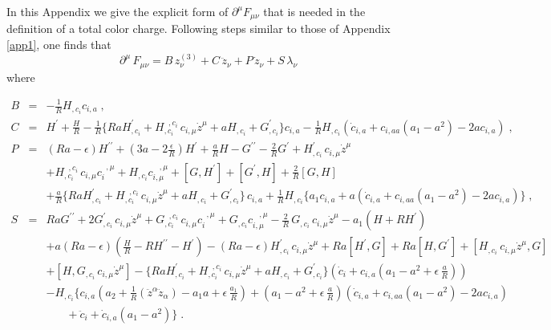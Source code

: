 \documentclass[a4paper,twocolumn,prd,showpacs,amsmath,amssymb]{revtex4}
\begin{document}
In this Appendix we give the explicit form of $\partial^{\mu} F_{\mu\nu}$
that is needed in the definition of a total color charge.
Following steps similar to those of Appendix \ref{app1}, one finds that
\[ \partial^{\mu} \, F_{\mu\nu} = B \, z^{(3)}_{\nu} + C \, \ddot{z}_{\nu}
+ P \, \dot{z}_{\nu} + S \, \lambda_{\nu} \] where
\begin{widetext}
\begin{eqnarray}
B & = & - \frac{1}{R} H_{,c_{i}} c_{i,a} \; , \\
C & = & H^{\prime} + \frac{H}{R} - \frac{1}{R} \lbrace R a H^{\prime}_{,c_{i}} +
H_{,c_{i}}^{\;\; ,c_{i}} \, c_{i,\mu} \dot{z}^{\mu} + a H_{,c_{i}}
+ G^{\prime}_{,c_{i}} \rbrace c_{i,a} - \frac{1}{R} H_{,c_{i}}
(\dot{c}_{i,a} + c_{i,aa} (a_1 - a^2) -2 a c_{i,a}) \; , \\
P & = & (R a - \epsilon) H^{\prime\prime} + (3 a -2 \frac{\epsilon}{R}) H^{\prime}
+ \frac{a}{R} H - G^{\prime\prime} - \frac{2}{R} G^{\prime} + H^{\prime}_{,c_{i}} \, c_{i,\mu} \dot{z}^{\mu} \nonumber \\
& & + H_{,c_{i}}^{\;\; ,c_{i}} \, c_{i,\mu} c_{i}^{\;\; ,\mu}
+ H_{,c_{i}} c_{i,\mu}^{\;\;\; ,\mu} + [G,H^{\prime}] + [G^{\prime},H] + \frac{2}{R} [G,H] \nonumber \\
& & + \frac{a}{R} \lbrace R a H^{\prime}_{,c_{i}} +
H_{,c_{i}}^{\;\; ,c_{i}} \, c_{i,\mu} \dot{z}^{\mu} + a H_{,c_{i}}
+ G^{\prime}_{,c_{i}} \rbrace \, c_{i,a} + \frac{1}{R} H_{,c_{i}}
\lbrace a_{1} c_{i,a} + a (\dot{c}_{i,a}
+ c_{i,aa} (a_1 - a^2) -2 a c_{i,a}) \rbrace\; , \\
S & = & R a G^{\prime\prime} + 2 G^{\prime}_{,c_{i}} \, c_{i,\mu} \dot{z}^{\mu}
+ G_{,c_{i}}^{\;\; ,c_{i}} \, c_{i,\mu} c_{i}^{\;\; ,\mu} + G_{,c_{i}} c_{i,\mu}^{\;\;\; ,\mu}
- \frac{2}{R} \, G_{,c_{i}} \, c_{i,\mu} \dot{z}^{\mu} - a_{1} (H + R H^{\prime})
\nonumber \\
& & + a (R a - \epsilon) (\frac{H}{R} - R H^{\prime\prime} - H^{\prime})
- (R a - \epsilon) H^{\prime}_{,c_{i}} \, c_{i,\mu} \dot{z}^{\mu}
+ R a [H^{\prime},G] + R a [H,G^{\prime}] + [H_{,c_{i}} \, c_{i,\mu} \dot{z}^{\mu},G]
\nonumber \\
& & + [H,G_{,c_{i}} \, c_{i,\mu} \dot{z}^{\mu}]
- \lbrace R a H^{\prime}_{,c_{i}} + H_{,c_{i}}^{\;\; ,c_{i}} \, c_{i,\mu} \dot{z}^{\mu}
+ a H_{,c_{i}} + G^{\prime}_{,c_{i}} \rbrace (\dot{c}_{i}
+ c_{i,a} (a_{1} - a^2 + \epsilon \, \frac{a}{R})) \nonumber \\
& & - H_{,c_{i}} \lbrace c_{i,a} (a_2 + \frac{1}{R} (\ddot{z}^{\alpha} \ddot{z}_{\alpha})
- a_1 a + \epsilon \, \frac{a_1}{R}) + (a_{1} - a^2 + \epsilon \, \frac{a}{R})
(\dot{c}_{i,a} + c_{i,aa} (a_1 - a^2) -2 a c_{i,a}) \nonumber \\
& & ~~~~~~~~ + \ddot{c}_{i} + \dot{c}_{i,a} (a_1 - a^2) \rbrace \; .
\end{eqnarray}
\end{widetext}
\end{document}
